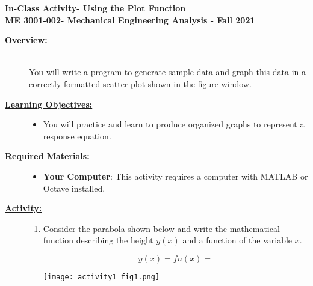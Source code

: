 \documentclass[12pt]{article}
\newcommand{\COURNAME}{ME 3001-002}
\newcommand{\CURRTERM}{Fall 2021} %
\newcommand{\MNUM}{1} %
\newcommand{\activitytitle}{Using the Plot Function} %
\begin{document}
\thispagestyle{plain}

\begin{center}
   {\bf \Large In-Class Activity\hspc\MNUM\hspc - \activitytitle}\vspace{3mm}\\
   {\bf \large \COURNAME - Mechanical Engineering Analysis - \CURRTERM} \vspace{5mm}\\
\end{center}

\begin{description}

\item[\textbf{\underline{Overview:}}] \hfill \vspace{3mm}\\
You will write a program to generate sample data and graph this data in a correctly formatted scatter plot shown in the figure window.

\item[\textbf{\underline{Learning Objectives:}}] \hfill \vspace{0mm}

\begin{itemize}
	\item You will practice and learn to produce organized graphs to represent a response equation. 
\end{itemize}

\item[\textbf{\underline{Required Materials:}}] \hfill \vspace{0mm}

\begin{itemize}
	\item {\bf Your Computer}: This activity requires a computer with MATLAB or Octave installed.
\end{itemize}

\item[\textbf{\underline{Activity:}}] \hfill \vspace{0mm}

\begin{enumerate}
	

	\item Consider the parabola shown below and write the mathematical function describing the height $y(x)$ and a function of the variable $x$.
	\begin{multicols}{2}

	\[ y(x)=fn(x)= \]


	\texttt{[image: activity1\_fig1.png]}	
	

\end{multicols}
\end{enumerate}
\end{description}
\end{document}
